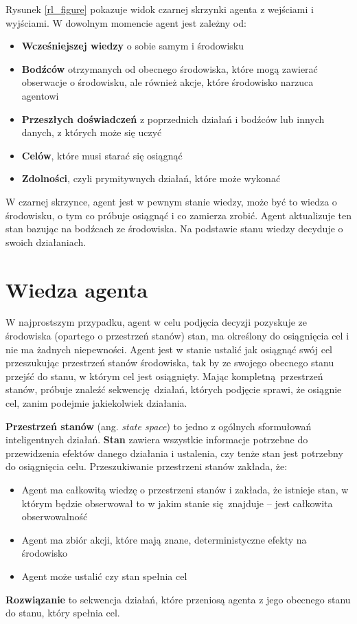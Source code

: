 \documentclass[a4paper, 12pt,oneside]{book}
\begin{document}
Rysunek \ref{rl_figure} pokazuje widok czarnej skrzynki agenta z wejściami
i wyjściami. W dowolnym momencie agent jest zależny od:
\begin{itemize}
	\setlength\itemsep{-0.4em}
	\item \textbf{Wcześniejszej wiedzy} o sobie samym i środowisku
	\item \textbf{Bodźców} otrzymanych od obecnego
		środowiska, które mogą zawierać obserwacje o
		środowisku, ale również akcje, które środowisko
		narzuca agentowi
	\item \textbf{Przeszłych doświadczeń} z poprzednich
		działań i bodźców lub innych danych, z których
		może się uczyć
	\item \textbf{Celów}, które musi starać się osiągnąć
	\item \textbf{Zdolności}, czyli prymitywnych działań, które
		może wykonać
\end{itemize}
W czarnej skrzynce, agent jest w pewnym stanie wiedzy, może być to wiedza o
środowisku, o tym co próbuje osiągnąć i co zamierza zrobić. Agent aktualizuje
ten stan bazując na bodźcach ze środowiska. Na podstawie stanu wiedzy decyduje
o swoich działaniach\cite{ai_foundations_agents_situated}.

\section{Wiedza agenta} 
W najprostszym przypadku, agent w celu podjęcia decyzji pozyskuje ze środowiska
(opartego o przestrzeń stanów) stan, ma określony do osiągnięcia cel i nie ma
żadnych niepewności. Agent jest w stanie ustalić jak osiągnąć swój cel
przeszukując przestrzeń stanów środowiska, tak by ze swojego obecnego stanu
przejść do stanu, w którym cel jest osiągnięty. Mając kompletną przestrzeń
stanów, próbuje znaleźć sekwencję działań, których podjęcie sprawi, że osiągnie
cel, zanim podejmie jakiekolwiek działania.

\textbf{Przestrzeń stanów} (ang. \textit{state space}) to jedno z ogólnych
sformułowań inteligentnych działań. \textbf{Stan} zawiera wszystkie informacje
potrzebne do przewidzenia efektów danego działania i ustalenia, czy tenże stan
jest potrzebny do osiągnięcia celu. Przeszukiwanie przestrzeni stanów zakłada,
że:
\begin{itemize}
	\setlength\itemsep{-0.4em}
\item Agent ma całkowitą wiedzę o przestrzeni stanów i zakłada, że istnieje
	stan, w którym będzie obserwował to w jakim stanie się znajduje --
	jest całkowita obserwowalność
\item Agent ma zbiór akcji, które mają znane, deterministyczne efekty na
	środowisko
\item Agent może ustalić czy stan spełnia cel
\end{itemize}
\textbf{Rozwiązanie} to sekwencja działań, które przeniosą agenta z jego
obecnego stanu do stanu, który spełnia cel.
\end{document}
